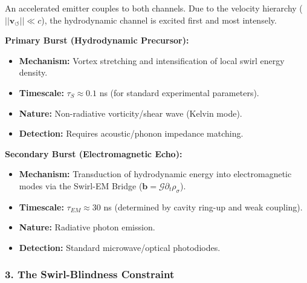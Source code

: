 \documentclass[10pt,reprint,aps,onecolumn,nofootinbib]{revtex4-2}
\begin{document}
                An accelerated emitter couples to both channels. Due to the velocity hierarchy ($||\mathbf{v}_{\circlearrowleft}|| \ll c$), the hydrodynamic channel is excited first and most intensely.

                \textbf{Primary Burst (Hydrodynamic Precursor):}

                \begin{itemize}
                        \item \textbf{Mechanism:} Vortex stretching and intensification of local swirl energy density.


                        \item \textbf{Timescale:} $\tau_S \approx 0.1$ ns (for standard experimental parameters).


                        \item \textbf{Nature:} Non-radiative vorticity/shear wave (Kelvin mode).


                        \item \textbf{Detection:} Requires acoustic/phonon impedance matching.


                \end{itemize}
                \textbf{Secondary Burst (Electromagnetic Echo):}

                \begin{itemize}
                        \item \textbf{Mechanism:} Transduction of hydrodynamic energy into electromagnetic modes via the Swirl-EM Bridge ($\mathbf{b} = \mathcal{G} \partial_t \rho_{\sigma}$).


                        \item \textbf{Timescale:} $\tau_{EM} \approx 30$ ns (determined by cavity ring-up and weak coupling).


                        \item \textbf{Nature:} Radiative photon emission.


                        \item \textbf{Detection:} Standard microwave/optical photodiodes.


                \end{itemize}


            \subsubsection*{\textbf{3. The Swirl-Blindness Constraint}}
\end{document}
